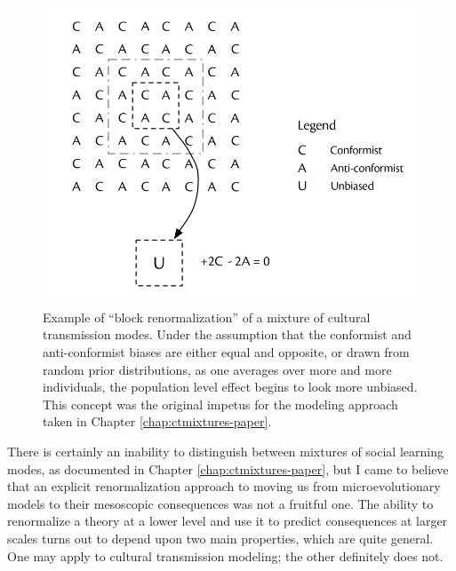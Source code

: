 \begin{figure}[ht!]
  \centering
  \includegraphics[scale=0.5]{graphics/conclusion/renormalizing-ct-modes.pdf}
  \caption{Example of ``block renormalization'' of a mixture of cultural transmission modes.  Under the assumption that the conformist and anti-conformist biases are either equal and opposite, or drawn from random prior distributions, as one averages over more and more individuals, the population level effect begins to look more unbiased.  This concept was the original impetus for the modeling approach taken in Chapter \ref{chap:ctmixtures-paper}.}
  \label{conc:fig:renormalizing-ct}
\end{figure}

There is certainly an inability to distinguish between mixtures of social learning modes, as documented in Chapter \ref{chap:ctmixtures-paper}, but I came to believe that an explicit renormalization approach to moving us from microevolutionary models to their mesoscopic consequences was not a fruitful one.  The ability to renormalize a theory at a lower level and use it to predict consequences at larger scales turns out to depend upon two main properties, which are quite general.  One may apply to cultural transmission modeling; the other definitely does not.

